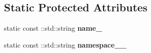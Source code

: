 \subsection*{Static Protected Attributes}
\begin{DoxyCompactItemize}
\item 
\hypertarget{classopenstack_1_1xml_1_1ServerCapacityUnavailable_a1520d905498b0c5efbb6f38059e02739}{
static const ::std::string {\bfseries name\_\-}}
\label{classopenstack_1_1xml_1_1ServerCapacityUnavailable_a1520d905498b0c5efbb6f38059e02739}

\item 
\hypertarget{classopenstack_1_1xml_1_1ServerCapacityUnavailable_a0dad2f09a10e0128dd837db6b5d3fba7}{
static const ::std::string {\bfseries namespace\_\-\_\-}}
\label{classopenstack_1_1xml_1_1ServerCapacityUnavailable_a0dad2f09a10e0128dd837db6b5d3fba7}

\end{DoxyCompactItemize}
